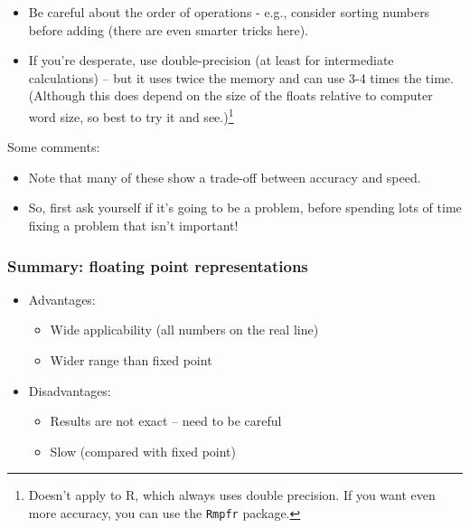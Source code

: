 \documentclass[11pt,a4paper]{article}
\begin{document}
\begin{frame}[fragile]
  \begin{itemize}	

	    \item Be careful about the order of operations - e.g., consider sorting numbers before adding (there are even smarter tricks here).
	
	    \item <2-> If you're desperate, use double-precision (at least for intermediate calculations) -- but it uses twice the memory and can use 3-4 times the time. (Although this does depend on the size of the floats relative to computer word size, so best to try it and see.)\footnote{Doesn't apply to R, which always uses double precision.  If you want even more accuracy, you can use the \texttt{Rmpfr} package.}
	\end{itemize}

\end{frame}
\begin{frame}[fragile]
	
	Some comments:
	\begin{itemize}
	    \item Note that many of these show a trade-off between accuracy and speed.
	    \item <2->So, first ask yourself if it's going to be a problem, before spending lots of time fixing a problem that isn't important!
	\end{itemize}
	
\end{frame}

\begin{frame}[fragile]
	\frametitle{Summary: floating point representations}

	\begin{itemize}
	    \item Advantages:
	    \begin{itemize}
	        \item Wide applicability (all numbers on the real line)
	        \item Wider range than fixed point
	    \end{itemize}
	    \item <2->Disadvantages:
	    \begin{itemize}
	        \item Results are not exact -- need to be careful
	        \item Slow (compared with fixed point)
	    \end{itemize}
	\end{itemize}
\end{frame}
\end{document}
